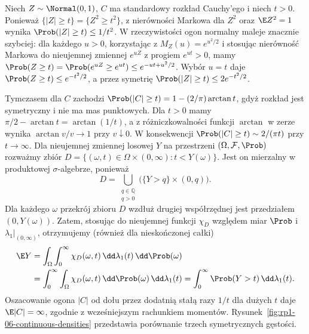 \begin{przyklad}
Niech $Z\sim\Normal(0,1)$, $C$ ma standardowy rozkład
Cauchy'ego i niech $t>0$. Ponieważ $\{|Z|\geq t\}=\{Z^2\geq t^2\}$,
z nierówności Markowa dla $Z^2$ oraz $\E Z^2=1$
wynika $\Prob(|Z|\geq t)\leq1/t^2$.
W rzeczywistości ogon normalny maleje znacznie szybciej:
dla każdego $u>0$, korzystając z
$M_Z(u)=e^{u^2/2}$ i stosując nierówność Markowa
do nieujemnej zmiennej $e^{uZ}$ z progiem $e^{ut}>0$, mamy
$\Prob(Z\geq t)=\Prob(e^{uZ}\geq e^{ut})
\leq e^{-ut+u^2/2}$.
Wybór $u=t$ daje $\Prob(Z\geq t)\leq e^{-t^2/2}$,
a przez symetrię $\Prob(|Z|\geq t)\leq2e^{-t^2/2}$.

Tymczasem dla $C$ zachodzi
$\Prob(|C|\geq t)=1-(2/\pi)\arctan t$,
gdyż rozkład jest symetryczny i nie ma mas punktowych.
Dla $t>0$ mamy $\pi/2-\arctan t=\arctan(1/t)$,
a z różniczkowalności funkcji $\arctan$ w zerze
wynika $\arctan v/v\to1$ przy $v\downarrow0$.
W konsekwencji $\Prob(|C|\geq t)\sim 2/(\pi t)$
przy $t\to\infty$.
Dla nieujemnej zmiennej losowej $Y$ na przestrzeni
$(\Omega,\mathcal F,\Prob)$ rozważmy zbiór
$D=\{(\omega,t)\in\Omega\times(0,\infty):t<Y(\omega)\}$.
Jest on mierzalny w produktowej $\sigma$-algebrze,
ponieważ
\[
D=\bigcup_{\substack{q\in\mathbb Q\\q>0}}
\bigl(\{Y>q\}\times(0,q)\bigr).
\]
Dla każdego $\omega$ przekrój zbioru $D$ wzdłuż
drugiej współrzędnej jest przedziałem $(0,Y(\omega))$.
Zatem, stosując 
do nieujemnej funkcji $\chi_D$ względem miar
$\Prob$ i $\lambda_1|_{(0,\infty)}$,
otrzymujemy (również dla nieskończonej całki)
\[
\begin{aligned}
\E Y
&=\int_\Omega\int_0^\infty\chi_D(\omega,t)\,
\dd\lambda_1(t)\,\dd\Prob(\omega)\\
&=\int_0^\infty\int_\Omega\chi_D(\omega,t)\,
\dd\Prob(\omega)\,\dd\lambda_1(t)
=\int_0^\infty\Prob(Y>t)\,\dd\lambda_1(t).
\end{aligned}
\]
Oszacowanie ogona $|C|$ od dołu przez dodatnią stałą
razy $1/t$ dla dużych $t$ daje $\E|C|=\infty$,
zgodnie z wcześniejszym rachunkiem momentów.
Rysunek~\ref{fig:rp1-06-continuous-densities} przedstawia porównanie trzech symetrycznych gęstości.
\end{przyklad}

